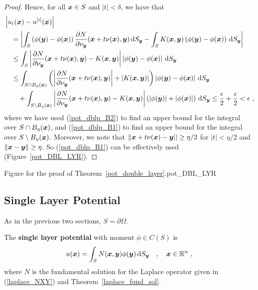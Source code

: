 \begin{proof}
Hence, for all ${\bm{x}} \in S$ and $|t|<\delta$, we have that
\begin{align*}
&\left| u_t({\bm{x}}) - u^{[i]}({\bm{x}}) \right| \\
&\quad = \left| \int_S \left( \phi({\bm{y}}) - \phi({\bm{x}}) \right) 
\frac{\partial{N}}{\partial \nu_{{\bm{y}}}}({\bm{x}} +t \nu({\bm{x}}),{\bm{y}})
\,\mathrm{d}{S}_{{\bm{y}}} - \int_S K({\bm{x}},{\bm{y}})
\left( \phi({\bm{y}}) - \phi({\bm{x}}) \right) \,\mathrm{d}{S}_{{\bm{y}}} \right| \\
&\quad \leq \int_S \left|
\frac{\partial{N}}{\partial \nu_{{\bm{y}}}}({\bm{x}} +t \nu({\bm{x}}),{\bm{y}})
- K({\bm{x}},{\bm{y}}) \right|
\left| \phi({\bm{y}}) - \phi({\bm{x}}) \right| \,\mathrm{d}{S}_{{\bm{y}}} \\
&\quad\leq \int_{S \cap B_{\eta}({\bm{x}})} \left(
\left|
\frac{\partial{N}}{\partial \nu_{{\bm{y}}}}({\bm{x}} +t \nu({\bm{x}}),{\bm{y}}) \right|
+\left| K({\bm{x}},{\bm{y}}) \right| \right)
\left| \phi({\bm{y}}) - \phi({\bm{x}}) \right| \,\mathrm{d}{S}_{{\bm{y}}} \\
&\qquad + \int_{S \setminus B_{\eta}({\bm{x}})}
\left| \frac{\partial{N}}{\partial \nu_{{\bm{y}}}}({\bm{x}} +t \nu({\bm{x}}),{\bm{y}})
- K({\bm{x}},{\bm{y}}) \right|
\left( \left| \phi({\bm{y}})\right|
+ \left|\phi({\bm{x}}) \right| \right) \,\mathrm{d}{S}_{{\bm{y}}}
\leq \frac{\epsilon}{2} + \frac{\epsilon}{2} < \epsilon \ ,
\end{align*}
where we have used (\ref{pot_dblp_B2}) to find an upper bound for the
integral over $S \cap B_{\eta}({\bm{x}})$, and (\ref{pot_dblp_B1}) to
find an upper bound for the integral over $S \setminus B_{\eta}({\bm{x}})$.
Moreover, we note that
$\| {\bm{x}} + t \nu({\bm{x}}) - {\bm{y}} || \geq \eta/2$
for $|t| < \eta/2$ and $\|{\bm{x}} - {\bm{y}} \| \geq \eta$.  So
(\ref{pot_dblp_B1}) can be effectively used (Figure~\ref{pot_DBL_LYR}).
\end{proof}

{Figure for the proof of Theorem~\ref{pot_double_layer}.}{pot_DBL_LYR}

\subsection{Single Layer Potential} \label{subsect_SLpot}

As in the previous two sections, $S = \partial \Omega$.

\begin{defn} \label{pot_spl_def}
The {\bfseries single layer potential} with moment
$\phi \in C(S)$ is
\[
u({\bm{x}}) = \int_S
N({\bm{x}},{\bm{y}}) \phi({\bm{y}}) \,\mathrm{d}{S}_{{\bm{y}}} \quad , \quad
{\bm{x}} \in \mathbb{R}^n \ ,
\]
where $N$ is the fundamental solution for the Laplace operator given in
(\ref{laplace_NXY}) and Theorem~\ref{laplace_fund_sol}.
\end{defn}

